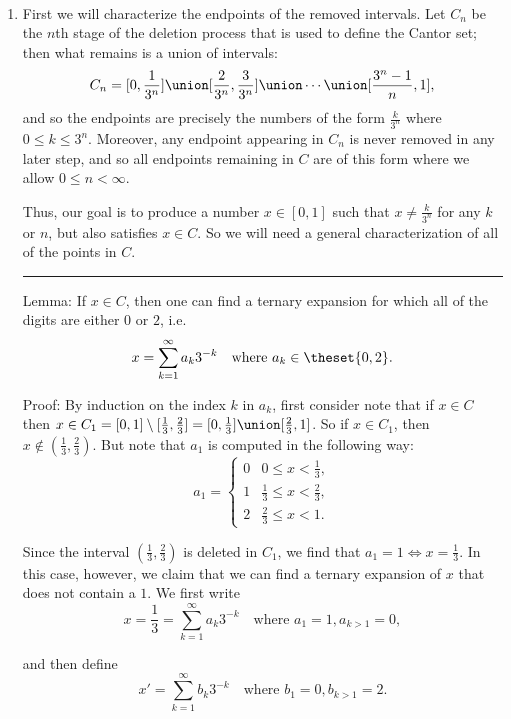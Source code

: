 \begin{solution}\hfill\\
  \begin{enumerate}
    \item First we will characterize the endpoints of the removed intervals. Let $C_n$ be the $n$th stage of the deletion process that is used to define the Cantor set; then what remains is a union of intervals:
    $$
    C_n = [0, \frac 1 {3^n}] \union [\frac 2 {3^n}, \frac 3 {3^n}] \union \cdots \union[\frac {3^n-1} n, 1],
    $$
    and so the endpoints are precisely the numbers of the form $\frac{k}{3^n}$ where $0 \leq k \leq 3^n$. Moreover, any endpoint appearing in $C_n$ is never removed in any later step, and so all endpoints remaining in $C$ are of this form where we allow $0\leq n < \infty$.

    Thus, our goal is to produce a number $x\in [0,1]$ such that $x \neq \frac k {3^n}$ for any $k$ or $n$, but also satisfies $x\in C$. So we will need a general characterization of all of the points in $C$.

    \vspace{1em}\hrule

    Lemma: If $x\in C$, then one can find a ternary expansion for which all of the digits are either $0$ or $2$, i.e.
    $$
    x = \sum_{k=1}^\infty a_k 3^{-k} \quad \text{where } a_k \in \theset{0, 2}.
    $$

    Proof: By induction on the index $k$ in $a_k$, first consider note that if $x\in C$ then $x \in C_1 = [0, 1] \setminus [\frac 1 3, \frac 2 3]= [0, \frac 1 3] \union [\frac 2 3, 1]$. So if $x\in C_1$, then $x\not\in(\frac 1 3, \frac 2 3)$. But note that $a_1$ is computed in the following way:
    $$
    a_1 = \begin{cases}
      0 & 0 \leq x < \frac 1 3, \\
      1 & \frac 1 3 \leq x < \frac 2 3, \\
      2 & \frac 2 3 \leq x < 1.
    \end{cases}
    $$

    Since the interval $(\frac 1 3, \frac 2 3)$ is deleted in $C_1$, we find that $a_1 = 1 \iff x = \frac 1 3$. In this case, however, we claim that we can find a ternary expansion of $x$ that does not contain a $1$.  We first write
    $$
    x = \frac 1 3 = \sum_{k=1}^\infty a_k 3^{-k} \quad \text{where } a_1 = 1, a_{k>1} = 0,
    $$

    and then define
    $$
    x' = \sum_{k=1}^\infty b_k 3^{-k} \quad\text{where } b_1 = 0, b_{k>1} = 2.
    $$


\end{enumerate}
\end{solution}
